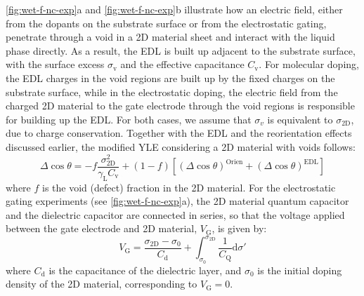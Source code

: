 \autoref{fig:wet-f-nc-exp}a and \autoref{fig:wet-f-nc-exp}b illustrate how
an electric field, either from the dopants on the substrate surface or
from the electrostatic gating, penetrate through a void in a 2D
material sheet and interact with the liquid phase directly. As a
result, the EDL is built up adjacent to the substrate surface, with
the surface excess \(\sigma_{\mathrm{v}}\) and the effective
capacitance \(C_{\mathrm{v}}\).  For molecular doping, the EDL charges
in the void regions are built up by the fixed charges on the substrate
surface, while in the electrostatic doping, the electric field from
the charged 2D material to the gate electrode through the void regions
is responsible for building up the EDL. For both cases, we assume that
\(\sigma_{v}\) is equivalent to \(\sigma_{\mathrm{2D}}\), due to
charge conservation. Together with the EDL and the reorientation
effects discussed earlier, the modified YLE considering a 2D material
with voids follows:
\begin{equation}
\label{eqn:wet-def-Delta-cos-mixture}
\Delta \cos \theta = -f\frac{\sigma_{\mathrm{2D}}^{2}}{\gamma_{\mathrm{L}} C_{\mathrm{v}}} 
                     + (1-f)[(\Delta \cos \theta)^{\mathrm{Orien}} + (\Delta \cos \theta)^{\mathrm{EDL}}]
\end{equation}
where \(f\) is the void (defect) fraction in the 2D material. For the
electrostatic gating experiments (see 
\autoref{fig:wet-f-nc-exp}a), the 2D material quantum capacitor
and the dielectric  capacitor are connected in
series, so that the voltage applied between the gate electrode and
2D material, \(V_{\mathrm{G}}\), is given by:
\begin{equation}
\label{eqn:wet-VG-gating}
V_{\mathrm{G}} = \frac{\sigma_{\mathrm{2D}} - \sigma_{\mathrm{0}}}{C_{\mathrm{d}}}
                  + \int_{\sigma_{0}}^{\sigma_{\mathrm{2D}}} \frac{1}{C_{\mathrm{Q}}} \mathrm{d}\sigma'
\end{equation}
where \(C_{\mathrm{d}}\) is the capacitance of the dielectric layer, and
\(\sigma_{0}\) is the initial doping density of the 2D material,
corresponding to \(V_{\mathrm{G}}=0\).


